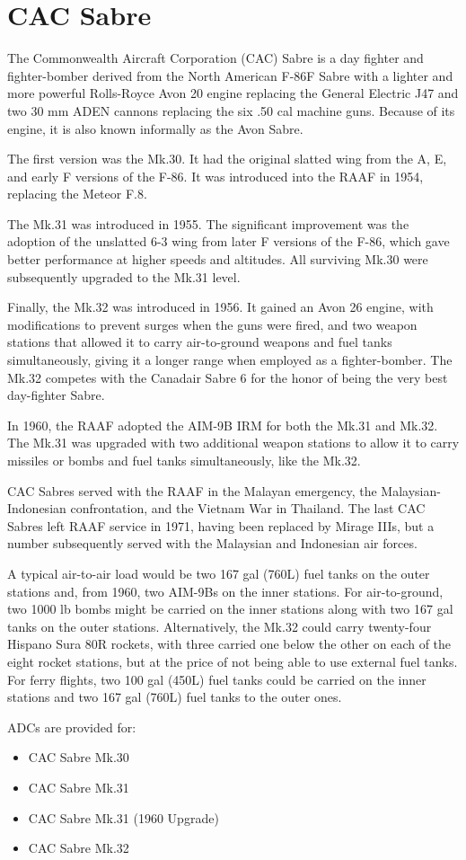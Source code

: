 \section*{CAC Sabre}

The Commonwealth Aircraft Corporation (CAC) Sabre is a day fighter and fighter-bomber derived from the North American F-86F Sabre with a lighter and more powerful Rolls-Royce Avon 20 engine replacing the General Electric J47 and two 30 mm ADEN cannons replacing the six .50 cal machine guns. Because of its engine, it is also known informally as the Avon Sabre. 

The first version was the Mk.30. It had the original slatted wing from the A, E, and early F versions of the F-86. It was introduced into the RAAF in 1954, replacing the Meteor F.8.

The Mk.31 was introduced in 1955. The significant improvement was the adoption of the unslatted 6-3 wing from later F versions of the F-86, which gave better performance at higher speeds and altitudes. All surviving Mk.30 were subsequently upgraded to the Mk.31 level. 

Finally, the Mk.32 was introduced in 1956. It gained an Avon 26 engine, with modifications to prevent surges when the guns were fired, and two weapon stations that allowed it to carry air-to-ground weapons and fuel tanks simultaneously, giving it a longer range when employed as a fighter-bomber. The Mk.32 competes with the Canadair Sabre 6 for the honor of being the very best day-fighter Sabre.

In 1960, the RAAF adopted the AIM-9B IRM for both the Mk.31 and Mk.32. The Mk.31 was upgraded with two additional weapon stations to allow it to carry missiles or bombs and fuel tanks simultaneously, like the Mk.32.

CAC Sabres served with the RAAF in the Malayan emergency, the Malaysian-Indonesian confrontation, and the Vietnam War in Thailand. The last CAC Sabres left RAAF service in 1971, having been replaced by Mirage IIIs, but a number subsequently served with the Malaysian and Indonesian air forces.

A typical air-to-air load would be two 167 gal (760L) fuel tanks on the outer stations and, from 1960, two AIM-9Bs on the inner stations. For air-to-ground, two 1000 lb bombs might be carried on the inner stations along with two 167 gal tanks on the outer stations. Alternatively, the Mk.32 could carry twenty-four Hispano Sura 80R rockets, with three carried one below the other on each of the eight rocket stations, but at the price of not being able to use external fuel tanks. For ferry flights, two 100 gal (450L) fuel tanks could be carried on the inner stations and two 167 gal (760L) fuel tanks to the outer ones.

ADCs are provided for:
\begin{itemize}
\item CAC Sabre Mk.30
\item CAC Sabre Mk.31
\item CAC Sabre Mk.31 (1960 Upgrade)
\item CAC Sabre Mk.32
\end{itemize}
